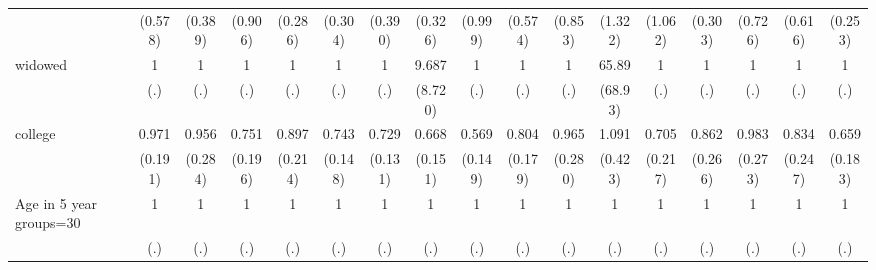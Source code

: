 {\begin{tabular}{l*{16}{c}}
                    &     (0.578)         &     (0.389)         &     (0.906)         &     (0.286)         &     (0.304)         &     (0.390)         &     (0.326)         &     (0.999)         &     (0.574)         &     (0.853)         &     (1.322)         &     (1.062)         &     (0.303)         &     (0.726)         &     (0.616)         &     (0.253)         \\
[1em]
widowed             &           1         &           1         &           1         &           1         &           1         &           1         &       9.687\sym{*}  &           1         &           1         &           1         &       65.89\sym{***}&           1         &           1         &           1         &           1         &           1         \\
                    &         (.)         &         (.)         &         (.)         &         (.)         &         (.)         &         (.)         &     (8.720)         &         (.)         &         (.)         &         (.)         &     (68.93)         &         (.)         &         (.)         &         (.)         &         (.)         &         (.)         \\
[1em]
college             &       0.971         &       0.956         &       0.751         &       0.897         &       0.743         &       0.729         &       0.668         &       0.569\sym{*}  &       0.804         &       0.965         &       1.091         &       0.705         &       0.862         &       0.983         &       0.834         &       0.659         \\
                    &     (0.191)         &     (0.284)         &     (0.196)         &     (0.214)         &     (0.148)         &     (0.131)         &     (0.151)         &     (0.149)         &     (0.179)         &     (0.280)         &     (0.423)         &     (0.217)         &     (0.266)         &     (0.273)         &     (0.247)         &     (0.183)         \\
[1em]
Age in 5 year groups=30&           1         &           1         &           1         &           1         &           1         &           1         &           1         &           1         &           1         &           1         &           1         &           1         &           1         &           1         &           1         &           1         \\
                    &         (.)         &         (.)         &         (.)         &         (.)         &         (.)         &         (.)         &         (.)         &         (.)         &         (.)         &         (.)         &         (.)         &         (.)         &         (.)         &         (.)         &         (.)         &         (.)         \\

\end{tabular}}

